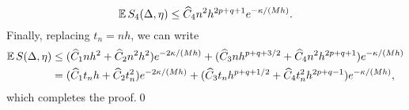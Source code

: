 \documentclass[10pt]{article}
\begin{document}
{	\begin{equation}
		\operatorname{\mathbb{E}} S_4(\Delta, \eta) \leq \widehat C_4 n^2 h^{2p+q+1}e^{-\kappa/(Mh)}.
	\end{equation}
	Finally, replacing $t_n = nh$, we can write
	\begin{equation}
	\begin{aligned}
		\operatorname{\mathbb{E}} S(\Delta, \eta) &\leq (\widehat C_1 n h^2 + \widehat C_2 n^2 h^2) e^{-2\kappa/(Mh)} + (\widehat C_3 n h^{p+q+3/2} + \widehat C_4 n^2 h^{2p+q+1})e^{-\kappa/(Mh)}\\
		&= (\widehat C_1 t_n h + \widehat C_2 t_n^2) e^{-2\kappa/(Mh)} + (\widehat C_3 t_n h^{p+q+1/2} + \widehat C_4 t_n^2 h^{2p+q-1})e^{-\kappa/(Mh)},
	\end{aligned}
	\end{equation}
	which completes the proof.\qed
}
%
%
\end{document}
